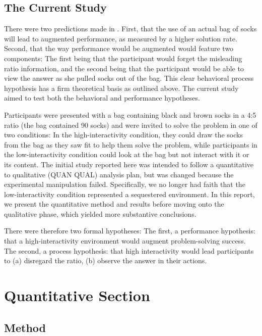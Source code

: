 \documentclass{article}
\begin{document}
\subsection{The Current Study}

There were two predictions made in \parencite{Vallée-Tourangeau2020a}. First, that the use of an actual bag of socks will lead to augmented performance, as measured by a higher solution rate. Second, that the way performance would be augmented would feature two components: The first being that the participant would forget the misleading ratio information, and the second being that the participant would be able to view the answer as she pulled socks out of the bag. This clear behavioral process hypothesis has a firm theoretical basis as outlined above. The current study aimed to test both the behavioral and performance hypotheses. 

Participants were presented with a bag containing black and brown socks in a 4:5 ratio (the bag contained 90 socks) and were invited to solve the problem in one of two conditions: In the high-interactivity condition, they could draw the socks from the bag as they saw fit to help them solve the problem, while participants in the low-interactivity condition could look at the bag but not interact with it or its content. The initial study reported here was intended to follow a quantitative to qualitative (QUAN QUAL) analysis plan, but was changed because the experimental manipulation failed. Specifically, we no longer had faith that the low-interactivity condition represented a sequestered environment. In this report, we present the quantitative method and results before moving onto the qualitative phase, which yielded more substantive conclusions. 

There were therefore two formal hypotheses: The first, a performance hypothesis: that a high-interactivity environment would augment problem-solving success. The second, a process hypothesis: that high interactivity would lead participants to (a) disregard the ratio, (b) observe the answer in their actions.

\section{Quantitative Section}

\subsection{Method}
\end{document}
